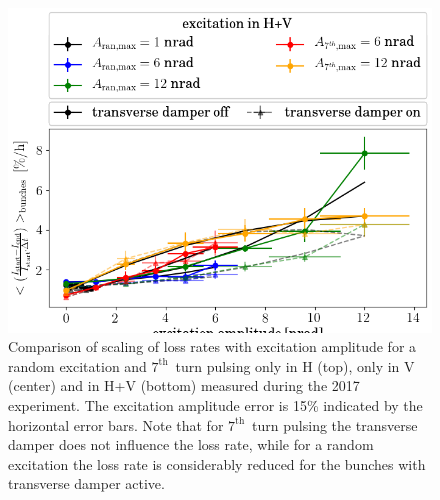 \documentclass[%
 reprint,
 amsmath,amssymb,
 aps,
prstab,
]{revtex4-1}
\begin{document}
\begin{figure}[h]
\begin{minipage}[t]{0.49\linewidth}
	\end{minipage}	
	\begin{minipage}[t]{0.49\linewidth}
		\centering
		\includegraphics[width=1.0\linewidth]{2017_scale_amp_ranhv_lbllong.png}
	\end{minipage}	
	\caption{\label{fig:ranexplossplane} Comparison of scaling of loss rates with excitation amplitude for a random excitation and $7^{\mathrm{th}}$~turn pulsing only in H (top), only in V (center) and in H+V (bottom) measured during the 2017 experiment. The excitation amplitude error is 15\% indicated by the horizontal error bars. Note that for $7^{\mathrm{th}}$~turn pulsing the transverse damper does not influence the loss rate, while for a random excitation the loss rate is considerably reduced for the bunches with transverse damper active.}
\end{figure}

\clearpage

\end{document}
